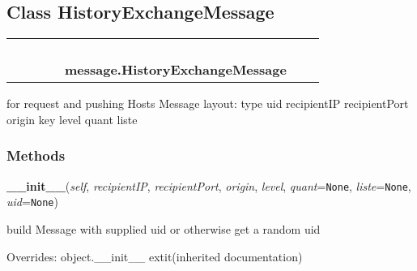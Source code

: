 

\subsection{Class HistoryExchangeMessage}

    \label{message:HistoryExchangeMessage}
\begin{tabular}{cccccccc}
\multicolumn{2}{r}{\settowidth{\BCL}{object}\multirow{2}{\BCL}{object}}
&&
&&
  \\\cline{3-3}
  &&\multicolumn{1}{c|}{}
&&
&&
  \\
\multicolumn{4}{r}{\settowidth{\BCL}{message.Message}\multirow{2}{\BCL}{message.Message}}
&&
  \\\cline{5-5}
  &&&&\multicolumn{1}{c|}{}
&&
  \\
&&&&\multicolumn{2}{l}{\textbf{message.HistoryExchangeMessage}}
\end{tabular}

for request and pushing Hosts Message layout: {\textbar} type {\textbar} 
uid {\textbar} recipientIP {\textbar} recipientPort {\textbar} origin key 
{\textbar} level {\textbar} quant {\textbar} liste {\textbar}



  \subsubsection{Methods}

    \vspace{0.5ex}

\hspace{.8\funcindent}\begin{boxedminipage}{\funcwidth}

    \raggedright \textbf{\_\_init\_\_}(\textit{self}, \textit{recipientIP}, \textit{recipientPort}, \textit{origin}, \textit{level}, \textit{quant}={\tt None}, \textit{liste}={\tt None}, \textit{uid}={\tt None})

\setlength{\parskip}{2ex}
    build Message with supplied uid or otherwise get a random uid

\setlength{\parskip}{1ex}
      Overrides: object.\_\_init\_\_ 	extit{(inherited documentation)}

    \end{boxedminipage}

